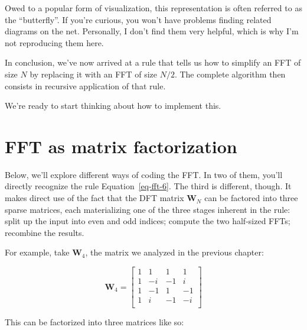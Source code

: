 \documentclass[
  letterpaper,
]{krantz}
\begin{document}
Owed to a popular form of visualization, this representation is often
referred to as the ``butterfly''. If you're curious, you won't have
problems finding related diagrams on the net. Personally, I don't find
them very helpful, which is why I'm not reproducing them here.

In conclusion, we've now arrived at a rule that tells us how to simplify
an FFT of size \(N\) by replacing it with an FFT of size \(N/2\). The
complete algorithm then consists in recursive application of that rule.

We're ready to start thinking about how to implement this.

\hypertarget{fft-as-matrix-factorization}{%
\section{\texorpdfstring{FFT as matrix
factorization}{FFT as matrix factorization}}\label{fft-as-matrix-factorization}}

Below, we'll explore different ways of coding the FFT. In two of them,
you'll directly recognize the rule Equation~\ref{eq-fft-6}. The third is
different, though. It makes direct use of the fact that the DFT matrix
\(\mathbf{W}_N\) can be factored into three sparse matrices, each
materializing one of the three stages inherent in the rule: split up the
input into even and odd indices; compute the two half-sized FFTs;
recombine the results.

For example, take \(\mathbf{W}_4\), the matrix we analyzed in the
previous chapter:

\[
\mathbf{W}_4
=
\begin{bmatrix}
1 &   1  & 1 &  1\\
1 &   -i  & -1 &  i\\
1 &   -1  & 1 &  -1\\
1 &   i  & -1 &  -i\\
\end{bmatrix}
\]

This can be factorized into three matrices like so:
\end{document}
